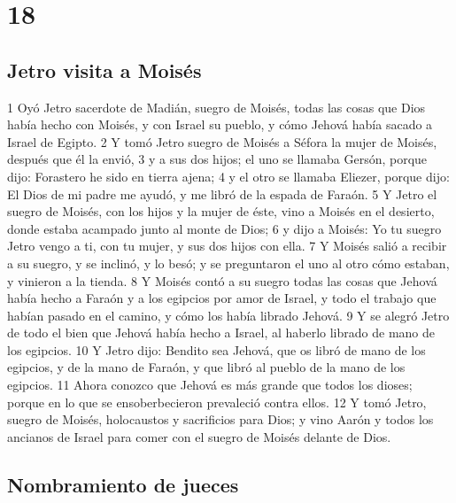 \chapter{18}

\section{Jetro visita a Moisés}

1 Oyó Jetro sacerdote de Madián, suegro de Moisés, todas las cosas que Dios había hecho con Moisés, y con Israel su pueblo, y cómo Jehová había sacado a Israel de Egipto.
2 Y tomó Jetro suegro de Moisés a Séfora la mujer de Moisés, después que él la envió,
3 y a sus dos hijos; el uno se llamaba Gersón, porque dijo: Forastero he sido en tierra ajena;
4 y el otro se llamaba Eliezer, porque dijo: El Dios de mi padre me ayudó, y me libró de la espada de Faraón.
5 Y Jetro el suegro de Moisés, con los hijos y la mujer de éste, vino a Moisés en el desierto, donde estaba acampado junto al monte de Dios;
6 y dijo a Moisés: Yo tu suegro Jetro vengo a ti, con tu mujer, y sus dos hijos con ella.
7 Y Moisés salió a recibir a su suegro, y se inclinó, y lo besó; y se preguntaron el uno al otro cómo estaban, y vinieron a la tienda.
8 Y Moisés contó a su suegro todas las cosas que Jehová había hecho a Faraón y a los egipcios por amor de Israel, y todo el trabajo que habían pasado en el camino, y cómo los había librado Jehová.
9 Y se alegró Jetro de todo el bien que Jehová había hecho a Israel, al haberlo librado de mano de los egipcios.
10 Y Jetro dijo: Bendito sea Jehová, que os libró de mano de los egipcios, y de la mano de Faraón, y que libró al pueblo de la mano de los egipcios.
11 Ahora conozco que Jehová es más grande que todos los dioses; porque en lo que se ensoberbecieron prevaleció contra ellos.
12 Y tomó Jetro, suegro de Moisés, holocaustos y sacrificios para Dios; y vino Aarón y todos los ancianos de Israel para comer con el suegro de Moisés delante de Dios.

\section{Nombramiento de jueces}

